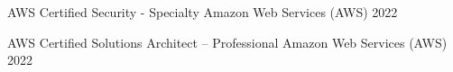 

\begin{cvhonors}

  \cvhonor
    {AWS Certified Security - Specialty} %
    {Amazon Web Services (AWS)} %
    {} %
    {2022} %

  \cvhonor
    {AWS Certified Solutions Architect – Professional} %
    {Amazon Web Services (AWS)} %
    {} %
    {2022} %


\end{cvhonors}
